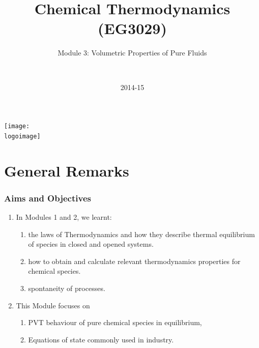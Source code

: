 \documentclass[10pt,compress]{beamer}
\institute{School of Engineering}
\title{Chemical Thermodynamics (EG3029)}
\subtitle{Module 3: Volumetric Properties of Pure Fluids}
\date[2014-15]{2014-15}
\author[\shortname]{%
  \fullname\\\ttfamily{\emailaddress}
}
\newcommand{\logoimage}{../../FigBanner/UoAHorizBanner}
\begin{document}
\begin{frame}
  \titlepage
  \vfill%
  \begin{center}
    \texttt{[image: \\logoimage]}
  \end{center}
\end{frame}





\section{General Remarks}

\begin{frame}
 \frametitle{Aims and Objectives}
   \begin{enumerate}
     \item<1-> In Modules 1 and 2, we learnt:
       \begin{enumerate}
         \item<1-> the laws of Thermodynamics and how they describe thermal equilibrium of species in closed and opened systems.
         \item<1-> how to obtain and calculate relevant thermodynamics properties for chemical species.
         \item<1-> spontaneity of processes.
       \end{enumerate} 
     \item<2-> This Module focuses on 
         \begin{enumerate}
           \item<2-> PVT behaviour of pure chemical species in equilibrium,
           \item<2-> Equations of state commonly used in industry.
         \end{enumerate}
   \end{enumerate}

\end{frame}


\end{document}
